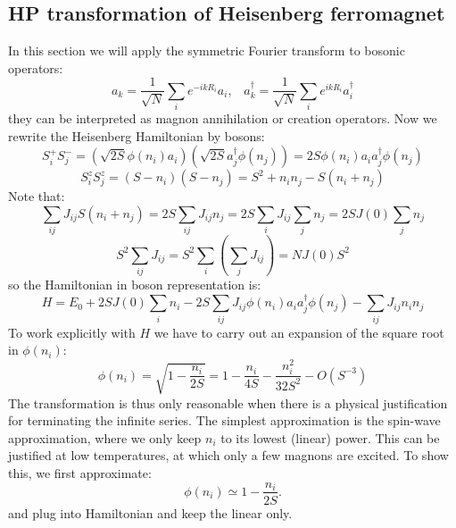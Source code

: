 \documentclass[11pt]{article}
\theoremstyle{remark}
\theoremstyle{definition}
\numberwithin{thm}{section}
\numberwithin{equation}{section}
\begin{document}
\subsection{HP transformation of Heisenberg ferromagnet}
In this section we will apply the symmetric Fourier transform to bosonic operators:
\begin{equation}
	a_k = \frac{1}{\sqrt{N}}\sum_{i} e^{-i k R_i}a_i,\;\;\; a_k^\dagger = \frac{1}{\sqrt{N}}\sum_{i} e^{ik R_i}  a_i^\dagger
\end{equation}
they can be interpreted as magnon annihilation or creation operators. Now we rewrite the Heisenberg Hamiltonian by bosons:
\begin{equation}
	S_i^+ S_j^- = \left( \sqrt{2S}\phi(n_i) a_i\right)\left( \sqrt{2S}a_j^\dagger \phi(n_j) \right) = 2S \phi(n_i) a_i a_j^\dagger \phi(n_j)
\end{equation}
\begin{equation}
	S_i^z S_j^z = \left(S - n_i\right)\left(S - n_j\right) = S^2 + n_i n_j - S(n_i + n_j)
\end{equation}
Note that:
\begin{equation}
	\sum_{ij}J_{ij}S(n_i + n_j) = 2S \sum_{ij}J_{ij}n_j = 2S \sum_{i}J_{ij}\sum_{j}n_j = 2SJ(0)\sum_{j}n_j
\end{equation}
\begin{equation}
	S^2 \sum_{ij}J_{ij} = S^2 \sum_{i} \left(\sum_{j} J_{ij} \right)  = N J(0) S^2
\end{equation}
so the Hamiltonian in boson representation is:
\begin{equation}
	H = E_0 + 2SJ(0)\sum_{i}n_i - 2S \sum_{ij}J_{ij}\phi(n_i)a_i a_j^\dagger \phi(n_j) - \sum_{ij}J_{ij}n_i n_j   
\end{equation}
To work explicitly with $H$ we have to carry out an expansion of the square root in  $\phi(n_i)$:
\begin{equation}
	\phi(n_i) = \sqrt{1 - \frac{n_i}{2S}} = 1 - \frac{n_i}{4S} - \frac{n_i^2}{32 S^2} - O(S^{-3})
\end{equation}
The transformation is thus only reasonable when there is a physical justification for terminating the infinite series. The simplest approximation is the spin-wave approximation, where we only keep $n_i$ to its lowest (linear) power. This can be justified at low temperatures, at which only a few magnons are excited. To show this, we first approximate:
\[
	\phi(n_i) \simeq 1 - \frac{n_i}{2S}
.\] 
and plug into Hamiltonian and keep the linear only. 
\end{document}

